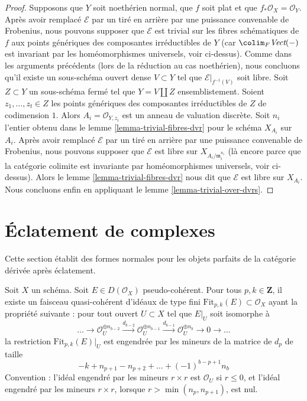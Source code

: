 \begin{proof}
\medskip\noindent
Supposons que $Y$ soit noethérien normal, que $f$ soit plat et que
$f_*\mathcal{O}_X = \mathcal{O}_Y$. Après avoir remplacé $\mathcal{E}$
par un tiré en arrière par une puissance convenable de Frobenius, nous pouvons supposer que $\mathcal{E}$
est trivial sur les fibres schématiques de $f$ aux points génériques
des composantes irréductibles de $Y$ (car
$\colim_F \textit{Vect}(-)$ est invariant par les homéomorphismes
universels, voir ci-dessus). Comme dans les arguments précédents
(lors de la réduction au cas noethérien), nous concluons qu'il existe un
sous-schéma ouvert dense $V \subset Y$ tel que $\mathcal{E}|_{f^{-1}(V)}$ soit libre.
Soit $Z \subset Y$ un sous-schéma fermé tel que
$Y = V \amalg Z$ ensemblistement. Soient $z_1, \ldots, z_t \in Z$
les points génériques des composantes irréductibles de $Z$
de codimension $1$. Alors $A_i = \mathcal{O}_{Y, z_i}$ est
un anneau de valuation discrète. Soit $n_i$ l'entier obtenu dans le
lemme \ref{lemma-trivial-fibres-dvr} pour le schéma $X_{A_i}$ sur $A_i$.
Après avoir remplacé $\mathcal{E}$ par un tiré en arrière par une puissance
convenable de Frobenius, nous pouvons supposer que $\mathcal{E}$ est libre sur
$X_{A_i/\mathfrak m_i^{n_i}}$ (là encore parce que la catégorie colimite
est invariante par homéomorphismes universels, voir ci-dessus).
Alors le lemme \ref{lemma-trivial-fibres-dvr} nous dit que
$\mathcal{E}$ est libre sur $X_{A_i}$.
Nous concluons enfin en appliquant le lemme \ref{lemma-trivial-over-dvrs}.
\end{proof}










\section{Éclatement de complexes}
\label{section-blowup-complexes}

\noindent
Cette section établit des formes normales pour les objets parfaits de la catégorie
dérivée après éclatement.

\begin{lemma}
\label{lemma-fitting-ideals-complex}
Soit $X$ un schéma. Soit $E \in D(\mathcal{O}_X)$ pseudo-cohérent.
Pour tous $p, k \in \mathbf{Z}$, il existe un faisceau quasi-cohérent
d'idéaux de type fini $\text{Fit}_{p, k}(E) \subset \mathcal{O}_X$
ayant la propriété suivante : pour tout ouvert $U \subset X$
tel que $E|_U$ soit isomorphe à
$$
\ldots \to
\mathcal{O}_U^{\oplus n_{b - 2}}
\xrightarrow{d_{b - 2}}
\mathcal{O}_U^{\oplus n_{b - 1}}
\xrightarrow{d_{b - 1}}
\mathcal{O}_U^{\oplus n_b} \to 0 \to \ldots
$$
la restriction $\text{Fit}_{p, k}(E)|_U$ est engendrée par les
mineurs de la matrice de $d_p$ de taille
$$
- k + n_{p + 1} - n_{p + 2} + \ldots + (-1)^{b - p + 1} n_b
$$
Convention : l'idéal engendré par les mineurs $r \times r$
est $\mathcal{O}_U$ si $r \leq 0$, et l'idéal engendré par les
mineurs $r \times r$, lorsque $r > \min(n_p, n_{p + 1})$, est nul.
\end{lemma}

